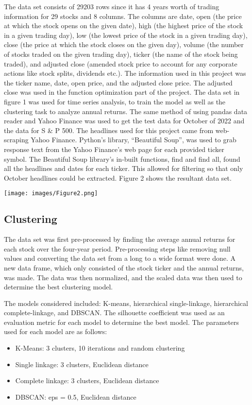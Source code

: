 \documentclass[12pt,a4paper, twoside]{article}
\begin{document}
\begin{multicols}{2}
    The data set consists of 29203 rows since it has 4 years worth of trading information for 29 stocks and 8 columns. The columns are date, open (the price at which the stock opens on the given date), high (the highest price of the stock in a given trading day),  low (the lowest price of the stock in a given trading day), close (the price at which the stock closes on the given day), volume (the number of stocks traded on the given trading day), ticker (the name of the stock being traded), and adjusted close (amended stock price to account for any corporate actions like stock splits, dividends etc.). The information used in this project was the ticker name, date, open price, and the adjusted close price. The adjusted close was used in the function optimization part of the project. The data set in figure 1 was used for time series analysis, to train the model as well as the clustering task to analyze annual returns. The same method of using pandas data reader and Yahoo Finance was used to get the test data for October of 2022 and the data for S \& P 500.
    \newline
    The headlines used for this project came from web-scraping Yahoo Finance. Python’s library, “Beautiful Soup”, was used to grab response text from the Yahoo Finance’s web page for each provided ticker symbol. The Beautiful Soup library’s in-built functions, find and find all, found all the headlines and dates for each ticker. This allowed for filtering so that only October headlines could be extracted. Figure 2 shows the resultant data set.
    \begin{center}
        \texttt{[image: images/Figure2.png]}
    \end{center}

\subsection{Clustering}
The data set was first pre-processed by finding the average annual returns for each stock over the four-year period. Pre-processing steps like removing null values and converting the data set from a long to a wide format were done. A new data frame, which only consisted of the stock ticker and the annual returns, was made. The data was then normalized, and the scaled data was then used to determine the best clustering model.
 
The models considered included: K-means, hierarchical single-linkage, hierarchical complete-linkage, and DBSCAN. The silhouette coefficient was used as an evaluation metric for each model to determine the best model. The parameters used for each model are as follows:
 \begin{itemize}
  \item K-Means: 3 clusters, 10 iterations and random clustering
  \item Single linkage: 3 clusters, Euclidean distance
  \item Complete linkage: 3 clusters, Euclidean distance
  \item DBSCAN: eps = 0.5, Euclidean distance
\end{itemize}
 

\end{multicols}
\end{document}
